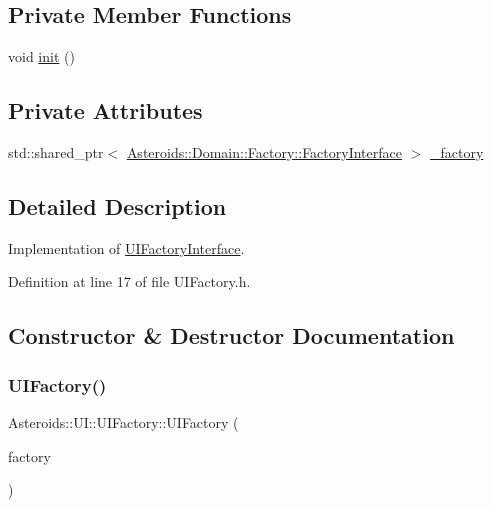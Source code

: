 \subsection*{Private Member Functions}
\begin{DoxyCompactItemize}
\item 
void \hyperlink{classAsteroids_1_1UI_1_1UIFactory_a4b3a29aad342a46b3ab713ca402095b6}{init} ()
\end{DoxyCompactItemize}
\subsection*{Private Attributes}
\begin{DoxyCompactItemize}
\item 
std\+::shared\+\_\+ptr$<$ \hyperlink{classAsteroids_1_1Domain_1_1Factory_1_1FactoryInterface}{Asteroids\+::\+Domain\+::\+Factory\+::\+Factory\+Interface} $>$ \hyperlink{classAsteroids_1_1UI_1_1UIFactory_ae8ba4636e6a333d0f57a7456e5555e9f}{\+\_\+factory}
\end{DoxyCompactItemize}


\subsection{Detailed Description}
Implementation of \hyperlink{classAsteroids_1_1UI_1_1UIFactoryInterface}{U\+I\+Factory\+Interface}. 

Definition at line 17 of file U\+I\+Factory.\+h.



\subsection{Constructor \& Destructor Documentation}
\mbox{\label{classAsteroids_1_1UI_1_1UIFactory_a47523bac4da1426badfd2dec54da7779}} 
\subsubsection{\texorpdfstring{U\+I\+Factory()}{UIFactory()}}
{\footnotesize\ttfamily Asteroids\+::\+U\+I\+::\+U\+I\+Factory\+::\+U\+I\+Factory (\begin{DoxyParamCaption}\item[{std\+::shared\+\_\+ptr$<$ \hyperlink{classAsteroids_1_1Domain_1_1Factory_1_1FactoryInterface}{Asteroids\+::\+Domain\+::\+Factory\+::\+Factory\+Interface} $>$}]{factory }\end{DoxyParamCaption})}



